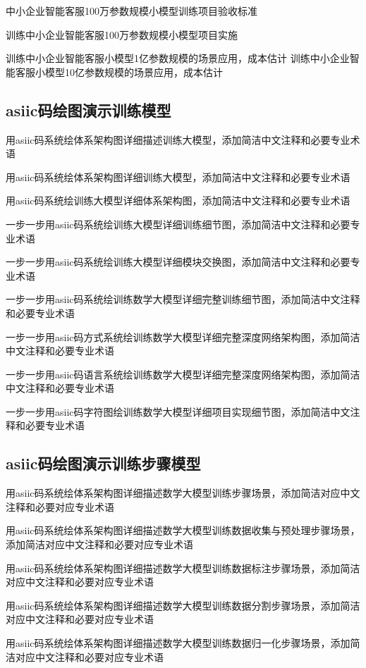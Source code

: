 \documentclass[12pt]{book}
\begin{document}
中小企业智能客服100万参数规模小模型训练项目验收标准

训练中小企业智能客服100万参数规模小模型项目实施

训练中小企业智能客服小模型1亿参数规模的场景应用，成本估计
训练中小企业智能客服小模型10亿参数规模的场景应用，成本估计

\subsection{asiic码绘图演示训练模型}
用asiic码系统绘体系架构图详细描述训练大模型，添加简洁中文注释和必要专业术语

用asiic码系统绘体系架构图详细训练大模型，添加简洁中文注释和必要专业术语

用asiic码系统绘训练大模型详细体系架构图，添加简洁中文注释和必要专业术语

一步一步用asiic码系统绘训练大模型详细训练细节图，添加简洁中文注释和必要专业术语

一步一步用asiic码系统绘训练大模型详细模块交换图，添加简洁中文注释和必要专业术语


一步一步用asiic码系统绘训练数学大模型详细完整训练细节图，添加简洁中文注释和必要专业术语


一步一步用asiic码方式系统绘训练数学大模型详细完整深度网络架构图，添加简洁中文注释和必要专业术语

一步一步用asiic码语言系统绘训练数学大模型详细完整深度网络架构图，添加简洁中文注释和必要专业术语

一步一步用asiic码字符图绘训练数学大模型详细项目实现细节图，添加简洁中文注释和必要专业术语


\subsection{asiic码绘图演示训练步骤模型}

用asiic码系统绘体系架构图详细描述数学大模型训练步骤场景，添加简洁对应中文注释和必要对应专业术语


用asiic码系统绘体系架构图详细描述数学大模型训练数据收集与预处理步骤场景，添加简洁对应中文注释和必要对应专业术语


用asiic码系统绘体系架构图详细描述数学大模型训练数据标注步骤场景，添加简洁对应中文注释和必要对应专业术语

用asiic码系统绘体系架构图详细描述数学大模型训练数据分割步骤场景，添加简洁对应中文注释和必要对应专业术语    


用asiic码系统绘体系架构图详细描述数学大模型训练数据归一化步骤场景，添加简洁对应中文注释和必要对应专业术语 
\end{document}
